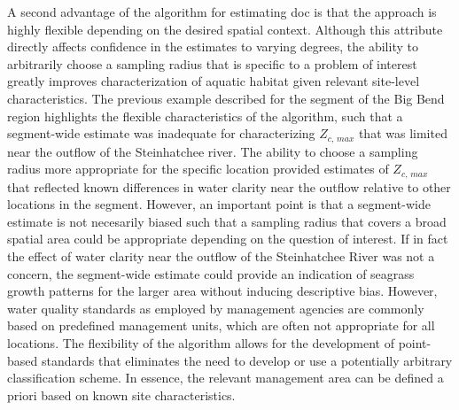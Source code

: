 \documentclass[letterpaper,12pt,oneside]{article}\usepackage[]{graphicx}\usepackage[]{color}
\begin{document}
A second advantage of the algorithm for estimating \ac{doc} is that the approach is highly flexible depending on the desired spatial context.  Although this attribute directly affects confidence in the estimates to varying degrees, the ability to arbitrarily choose a sampling radius that is specific to a problem of interest greatly improves characterization of aquatic habitat given relevant site-level characteristics.  The previous example described for the segment of the Big Bend region highlights the flexible characteristics of the algorithm, such that a segment-wide estimate was inadequate for characterizing $Z_{c,\,max}$ that was limited near the outflow of the Steinhatchee river.  The ability to choose a sampling radius more appropriate for the specific location provided estimates of $Z_{c,\,max}$ that reflected known differences in water clarity near the outflow relative to other locations in the segment.  However, an important point is that a segment-wide estimate is not necesarily biased such that a sampling radius that covers a broad spatial area could be appropriate depending on the question of interest.  If in fact the effect of water clarity near the outflow of the Steinhatchee River was not a concern, the segment-wide estimate could provide an indication of seagrass growth patterns for the larger area without inducing descriptive bias.  However, water quality standards as employed by management agencies are commonly based on predefined management units, which are often not appropriate for all locations.  The flexibility of the algorithm allows for the development of point-based standards that eliminates the need to develop or use a potentially arbitrary classification scheme.  In essence, the relevant management area can be defined a priori based on known site characteristics.
\end{document}
